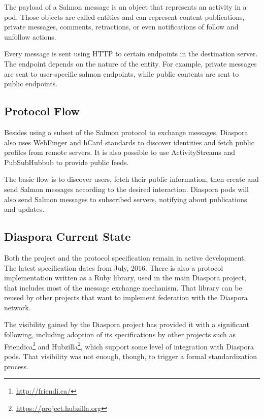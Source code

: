 The payload of a Salmon message is an object that represents an
activity in a pod. Those objects are called entities and can represent
content publications, private messages, comments, retractions, or even
notifications of follow and unfollow actions.

Every message is sent using HTTP to certain endpoints in the destination
server.  The endpoint depends on the nature of the entity. For example,
private messages are sent to user-specific salmon endpoints, while
public contents are sent to public endpoints.

\subsection{Protocol Flow}

Besides using a subset of the Salmon protocol to exchange messages,
Diaspora also uses WebFinger and hCard standards to discover identities
and fetch public profiles from remote servers. It is also possible to
use ActivityStreams and PubSubHubbub to provide public feeds.

The basic flow is to discover users, fetch their public information,
then create and send Salmon messages according to the desired
interaction. Diaspora pods will also send Salmon messages to subscribed
servers, notifying about publications and updates.

\subsection{Diaspora Current State}

Both the project and the protocol specification remain in active
development. The latest specification dates from July, 2016. There is
also a protocol implementation written as a Ruby library, used in the
main Diaspora project, that includes most of the message exchange
mechanism. That library can be reused by other projects that want to
implement federation with the Diaspora network.

The visibility gained by the Diaspora project has provided it with a
significant following, including adoption of its specifications by other
projects such as Friendica\footnote{\url{http://friendi.ca/}} and
Hubzilla\footnote{\url{https://project.hubzilla.org}}, which support some
level of integration with Diaspora pods. That visibility was not enough,
though, to trigger a formal standardization process.
